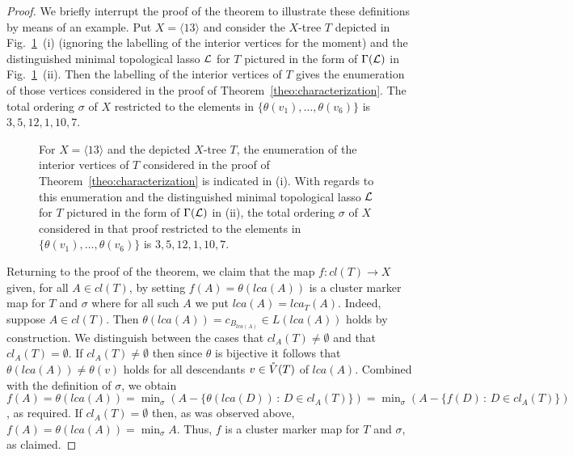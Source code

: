 \begin{proof}
  We briefly interrupt the proof of the theorem to illustrate these
  definitions by means of an example. Put $X=\langle 13\rangle$ and consider
  the $X$-tree $T$ depicted in Fig.~\ref{fig:illustration-main-theorem}~(i)
  (ignoring the labelling of the interior vertices for the moment) and the
  distinguished minimal topological lasso ${\mathcal L}$ for $T$ pictured in the form
  of $\Gamma({\mathcal L})$ in Fig.~\ref{fig:illustration-main-theorem}~(ii). Then the
  labelling of the interior vertices of $T$ gives the enumeration of those
  vertices considered in the proof of Theorem~\ref{theo:characterization}. The
  total ordering $\sigma$ of $X$ restricted to the elements in
  $\{\theta(v_1),\ldots, \theta(v_6)\}$ is $3,5,12,1,10,7$.

  \begin{figure}[h]
    \begin{center}
      
    \end{center}
    \caption{ For $X=\langle 13\rangle$ and the depicted $X$-tree $T$, the
      enumeration of the interior vertices of $T$ considered in the proof of
      Theorem~\ref{theo:characterization} is indicated in (i). With regards to
      this enumeration and the distinguished minimal topological lasso ${\mathcal L}$ for
      $T$ pictured in the form of $\Gamma({\mathcal L})$ in (ii), the total ordering
      $\sigma$ of $X$ considered in that proof restricted to the elements in
      $\{\theta(v_1),\ldots, \theta(v_6)\}$ is $3,5,12,1,10,7$.}
    \label{fig:illustration-main-theorem}
  \end{figure}

  Returning to the proof of the theorem, we claim that the map $f:cl(T)\to X$
  given, for all $A\in cl(T)$, by setting $f(A)=\theta(lca(A))$ is a cluster
  marker map for $T$ and $\sigma$ where for all such $A$ we put
  $lca(A)=lca_T(A)$. Indeed, suppose $A\in cl(T)$.  Then
  $\theta(lca(A))=c_{B_{lca(A)}}\in L(lca(A))$ holds by construction.  We
  distinguish between the cases that $cl_A(T)\not =\emptyset$ and that
  $cl_A(T)=\emptyset$. If $cl_A(T)\not =\emptyset$ then since $\theta$ is
  bijective it follows that $\theta(lca(A))\not=\theta(v)$ holds for all
  descendants $v\in \mathring{V}(T)$ of $lca(A)$.  Combined with the definition of
  $\sigma$, we obtain
  $f(A)=\theta(lca(A))=\min_{\sigma}(A-\{\theta(lca(D))\,:\, D\in cl_A(T)\})=
  \min_{\sigma}(A-\{f(D)\,:\, D\in cl_A(T)\})$, as required.  If
  $cl_A(T)=\emptyset$ then, as was observed above,
  $f(A)=\theta(lca(A))=\min_{\sigma}A$. Thus, $f$ is a cluster marker map for
  $T$ and $\sigma$, as claimed.


\end{proof}
